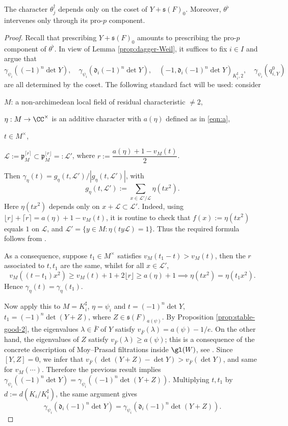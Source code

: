 \documentclass[a4paper,10pt]{article}
\begin{document}
\begin{lemma}\label{prop:dagger-indep}
	The character $\theta_j^\dagger$ depends only on the coset of $Y + \mathfrak{s}(F)_0$. Moreover, $\theta^\flat$ intervenes only through its pro-$p$ component.
\end{lemma}
\begin{proof}
	Recall that prescribing $Y + \mathfrak{s}(F)_0$ amounts to prescribing the pro-$p$ component of $\theta^\flat$. In view of Lemma \ref{prop:dagger-Weil}, it suffices to fix $i \in I$ and argue that
	\[ \gamma_{\psi_i}((-1)^n \det Y), \quad \gamma_{\psi_i}\left( \mathfrak{d}_i (-1)^n \det Y \right), \quad (-1, \mathfrak{d}_i (-1)^n \det Y )_{K_i^\sharp, 2} , \quad \gamma_{\psi_i}(q_{i,Y}^0) \]
	are all determined by the coset. The following standard fact will be used: consider
	\begin{compactitem}
		\item $M$: a non-archimedean local field of residual characteristic $\neq 2$,
		\item $\eta: M \to \CC^\times$ is an additive character with $a(\eta)$ defined as in \eqref{eqn:a},
		\item $t \in M^\times$,
		\item $\mathcal{L} := \mathfrak{p}_M^{\lceil r \rceil} \subset \mathfrak{p}_M^{\lfloor r \rfloor} =: \mathcal{L}'$, where $r := \dfrac{a(\eta) + 1 - v_M(t)}{2}$.
	\end{compactitem}
	Then $\gamma_\eta(t) = g_\eta(t, \mathcal{L}') \big/ |g_\eta(t, \mathcal{L}')|$, with
	\[ g_\eta(t, \mathcal{L}') := \sum_{x \in \mathcal{L}'/\mathcal{L}} \eta(tx^2). \]
	Here $\eta(tx^2)$ depends only on $x + \mathcal{L} \subset \mathcal{L}'$. Indeed, using $\lfloor r \rfloor + \lceil r \rceil = a(\eta) + 1 -v_M(t)$, it is routine to check that $f(x) := \eta(tx^2)$ equals $1$ on $\mathcal{L}$, and $\mathcal{L}' = \{y \in M: \eta(ty\mathcal{L})=1 \}$. Thus the required formula follows from \cite[\S 16 and \S 27]{Weil64}.
	
	As a consequence, suppose $t_1 \in M^\times$ satisfies $v_M(t_1 - t) > v_M(t)$, then the $r$ associated to $t,t_1$ are the same, whilst for all $x \in \mathcal{L}'$,
	\[ v_M\left((t-t_1)x^2\right) \geq v_M(t) + 1 + 2\lfloor r \rfloor \geq a(\eta) + 1 \implies \eta(tx^2) = \eta(t_1 x^2). \]
	Hence $\gamma_\eta(t) = \gamma_\eta(t_1)$.
	
	Now apply this to $M = K_i^\sharp$, $\eta = \psi_i$ and $t = (-1)^n \det Y$, $t_1 = (-1)^n \det(Y+Z)$, where $Z \in \mathfrak{s}(F)_{a(\psi)}$. By Proposition \ref{prop:stable-good-2}, the eigenvalues $\lambda \in \bar{F}$ of $Y$ satisfy $v_{\bar{F}}(\lambda) = a(\psi) - 1/e$. On the other hand, the eigenvalues of $Z$ satisfy $v_{\bar{F}}(\lambda) \geq a(\psi)$; this is a consequence of the concrete description of Moy--Prasad filtrations inside $\gl(W)$, see \cite[\S 4.1]{LMS16}. Since $[Y,Z]=0$, we infer that $v_{\bar{F}}(\det(Y+Z) - \det Y) > v_{\bar{F}}(\det Y)$, and same for $v_M(\cdots)$. Therefore the previous result implies $\gamma_{\psi_i}((-1)^n \det Y) = \gamma_{\psi_i}((-1)^n \det(Y+Z))$. Multiplying $t, t_1$ by $d := d(K_i/K_i^\sharp)$, the same argument gives
	\[ \gamma_{\psi_i}( \mathfrak{d}_i (-1)^n \det Y) = \gamma_{\psi_i}(\mathfrak{d}_i (-1)^n \det(Y+Z)). \]
	

\end{proof}
\end{document}
